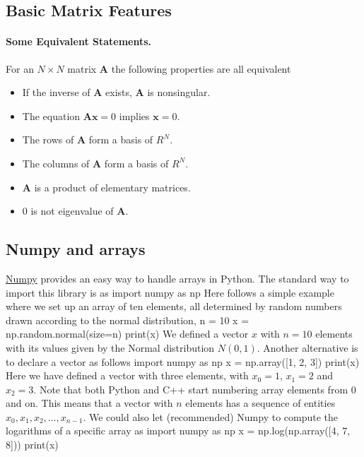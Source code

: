 \documentclass[%
oneside,                 %
final,                   %
10pt]{article}
\begin{document}
\noindent
\subsection{Basic Matrix Features}


\paragraph{Some Equivalent Statements.}
For an $N\times N$ matrix  $\mathbf{A}$ the following properties are all equivalent

\begin{itemize}
  \item If the inverse of $\mathbf{A}$ exists, $\mathbf{A}$ is nonsingular.

  \item The equation $\mathbf{Ax}=0$ implies $\mathbf{x}=0$.

  \item The rows of $\mathbf{A}$ form a basis of $R^N$.

  \item The columns of $\mathbf{A}$ form a basis of $R^N$.

  \item $\mathbf{A}$ is a product of elementary matrices.

  \item $0$ is not eigenvalue of $\mathbf{A}$.
\end{itemize}

\noindent




\subsection{Numpy and arrays}
\href{{http://www.numpy.org/}}{Numpy} provides an easy way to handle arrays in Python. The standard way to import this library is as
\bpycod
import numpy as np
\epycod
Here follows a simple example where we set up an array of ten elements, all determined by random numbers drawn according to the normal distribution,
\bpycod
n = 10
x = np.random.normal(size=n)
print(x)
\epycod
We defined a vector $x$ with $n=10$ elements with its values given by the Normal distribution $N(0,1)$.
Another alternative is to declare a vector as follows
\bpycod
import numpy as np
x = np.array([1, 2, 3])
print(x)
\epycod
Here we have defined a vector with three elements, with $x_0=1$, $x_1=2$ and $x_2=3$. Note that both Python and C++
start numbering array elements from $0$ and on. This means that a vector with $n$ elements has a sequence of entities $x_0, x_1, x_2, \dots, x_{n-1}$. We could also let (recommended) Numpy to compute the logarithms of a specific array as
\bpycod
import numpy as np
x = np.log(np.array([4, 7, 8]))
print(x)
\epycod
\end{document}
